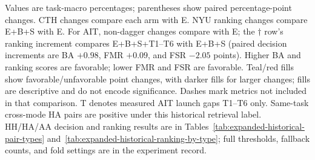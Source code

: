 \documentclass[10pt]{article}
\begin{document}
\begin{table}[!htbp]
\begin{minipage}{\linewidth}\footnotesize
Values are task-macro percentages; parentheses show paired percentage-point changes. CTH changes compare each arm with E. NYU ranking changes compare E+B+S with E. For AIT, non-dagger changes compare with E; the $\dagger$ row's ranking increment compares E+B+S+T1--T6 with E+B+S (paired decision increments are BA $+0.98$, FMR $+0.09$, and FSR $-2.05$ points). Higher BA and ranking scores are favorable; lower FMR and FSR are favorable. Teal/red fills show favorable/unfavorable point changes, with darker fills for larger changes; fills are descriptive and do not encode significance. Dashes mark metrics not included in that comparison. T denotes measured AIT launch gaps T1--T6 only. Same-task cross-mode HA pairs are positive under this historical retrieval label. HH/HA/AA decision and ranking results are in Tables~\ref{tab:expanded-historical-pair-types} and~\ref{tab:expanded-historical-ranking-by-type}; full thresholds, fallback counts, and fold settings are in the experiment record.
\end{minipage}
\end{table}
\end{document}
